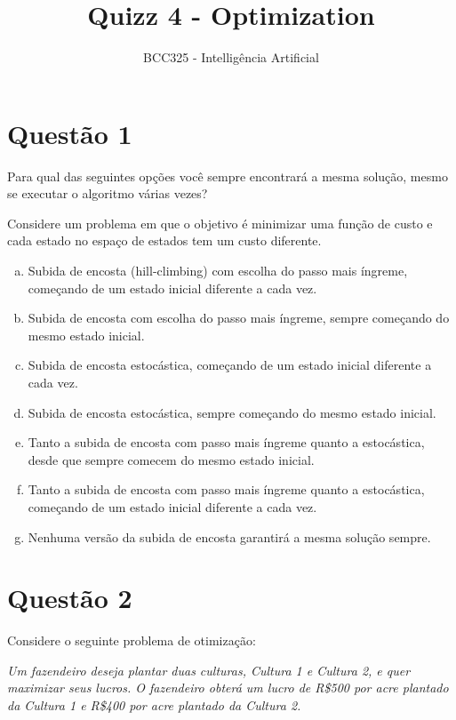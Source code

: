 \documentclass{article}
\begin{document}
\title{Quizz 4 - Optimization}
\author{BCC325 - Intelligência Artificial}
\date{}

\maketitle

\section*{Questão 1}

Para qual das seguintes opções você sempre encontrará a mesma solução, mesmo se executar o algoritmo várias vezes?

Considere um problema em que o objetivo é minimizar uma função de custo e cada estado no espaço de estados tem um custo diferente.

\begin{enumerate}[a)]
    \item Subida de encosta (hill-climbing) com escolha do passo mais íngreme, começando de um estado inicial diferente a cada vez.
    \item Subida de encosta com escolha do passo mais íngreme, sempre começando do mesmo estado inicial.
    \item Subida de encosta estocástica, começando de um estado inicial diferente a cada vez.
    \item Subida de encosta estocástica, sempre começando do mesmo estado inicial.
    \item Tanto a subida de encosta com passo mais íngreme quanto a estocástica, desde que sempre comecem do mesmo estado inicial.
    \item Tanto a subida de encosta com passo mais íngreme quanto a estocástica, começando de um estado inicial diferente a cada vez.
    \item Nenhuma versão da subida de encosta garantirá a mesma solução sempre.
\end{enumerate}



\section*{Questão 2}

Considere o seguinte problema de otimização:

\textit{Um fazendeiro deseja plantar duas culturas, Cultura 1 e Cultura 2, e quer maximizar seus lucros. O fazendeiro obterá um lucro de R\$500 por acre plantado da Cultura 1 e R\$400 por acre plantado da Cultura 2.}
\end{document}
